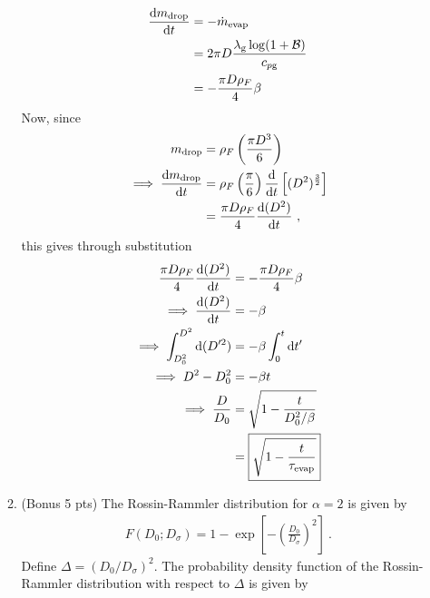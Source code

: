 \documentclass[12pt]{article}
\begin{document}
\begin{enumerate}[label=(\alph*)]
\begin{enumerate}[label=(\roman*)]
\begin{equation}
						\begin{aligned}
							\frac{\textup d m_\mathrm{drop}}{\textup d t}&=-\dot{m}_\mathrm{evap}\\
							&=2\pi D\frac{\lambda_\mathrm{g}\log(1+\mathcal{B})}{c_{p\mathrm{g}}}\\
							&=-\frac{\pi D\rho_F}{4}\beta
						\end{aligned}
					\end{equation} 
					Now, since
					\begin{equation}
						\begin{aligned}
							m_\mathrm{drop}&=\rho_F\left(\frac{\pi D^3}{6}\right)\\
							\implies \frac{\textup d m_\mathrm{drop}}{\textup d t}&=\rho_F\left(\frac{\pi}{6}\right)\frac{\textup d}{\textup d t}\left[(D^2)^{\frac{3}{2}}\right]\\
							&=\frac{\pi D\rho_F}{4}\frac{\textup d(D^2)}{\textup d t}\ ,
						\end{aligned}
					\end{equation} 
					this gives through substitution
					\begin{equation}
						\begin{aligned}
							\frac{\pi D\rho_F}{4}\frac{\textup d(D^2)}{\textup d t}&=-\frac{\pi D\rho_F}{4}\beta\\ 
							\implies \frac{\textup d(D^2)}{\textup d t}&=-\beta \\
							\implies \int_{D_0^2}^{D^2}\textup d(D^{\prime 2})&=-\beta\int_{0}^{t}\textup d t^\prime\\
							\implies D^2-D_0^2&=-\beta t\\
							\implies \frac{D}{D_0}&=\sqrt{1-\frac{t}{D_0^2/\beta}} \\
							&=\boxed{\sqrt{1-\frac{t}{\tau_\mathrm{evap}}}}\\
						\end{aligned}
					\end{equation} 
				\item (Bonus 5 pts)
					The Rossin-Rammler distribution for $\alpha=2$ is given by
					\begin{equation}
						\begin{aligned}
							F(D_0;D_\sigma)=1-\exp\left[-\left(\frac{D_0}{D_\sigma}\right)^{2}\right]\ .
						\end{aligned}
					\end{equation} 
					Define $\Delta=(D_0/D_\sigma)^2$. The probability density function of the Rossin-Rammler distribution with respect to $\Delta$ is given by
					\begin{equation}
						\begin{aligned}

\end{aligned}
\end{equation}
\end{enumerate}
\end{enumerate}
\end{document}
